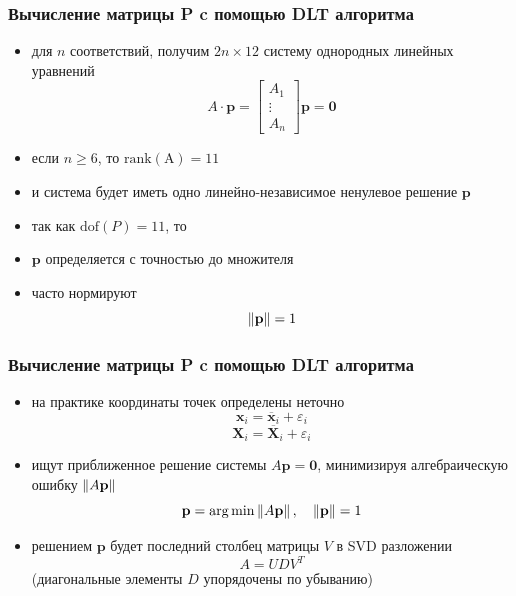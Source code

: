 \documentclass[12pt,usepdftitle=false,aspectratio=1610]{beamer}
\DeclarePairedDelimiter{\norm}{\lVert}{\rVert}
\begin{document}
\begin{frame}
\frametitle{Вычисление матрицы P c помощью DLT алгоритма}
\begin{itemize}
    \item для $n$ соответствий, получим $2n\times 12$ систему однородных линейных уравнений 
    $$
        A\cdot\mathbf{p}=
        \begin{bmatrix}
            A_1\\
            \vdots\\
            A_n
        \end{bmatrix}
        \mathbf{p}=
        \mathbf{0}
    $$
    \item если $n\geqslant 6$, то $\mathrm{rank}(\mathrm{A})=11$
    \item и система будет иметь одно линейно-независимое ненулевое решение $\mathbf{p}$
    \item так как $\mathrm{dof}(P)=11$, то
    \item $\mathbf{p}$ определяется с точностью до множителя
    \item часто нормируют
    $$
        \norm{\mathbf{p}}=1
    $$
\end{itemize}
\end{frame}

\begin{frame}
\frametitle{Вычисление матрицы P c помощью DLT алгоритма}
\begin{itemize}
    \item на практике координаты точек определены неточно
    $$
        \mathbf{x}_i=\overline{\mathbf{x}}_i+\varepsilon_i
    $$
    $$
        \mathbf{X}_i=\overline{\mathbf{X}}_i+\varepsilon_i
    $$
    \item ищут приближенное решение системы $A\mathbf{p}=\mathbf{0}$,
    минимизируя алгебраическую ошибку $\norm{A\mathbf{p}}$
    $$
        \mathbf{p}=\arg\min\,
        \norm{A\mathbf{p}}\,,\quad
        \norm{\mathbf{p}}=1
    $$
    \item решением $\mathbf{p}$ будет последний столбец матрицы $V$ 
          в SVD разложении  
          $$
            A=UDV^T
          $$
          (диагональные элементы $D$ упорядочены по убыванию)
\end{itemize}
\end{frame}
\end{document}
